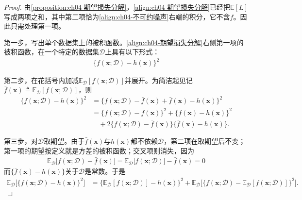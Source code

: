 \documentclass[../../main.tex]{subfiles}
\begin{document}
\begin{proof}
由\cref{proposition:ch04-期望损失分解}，\eqref{align:ch04-期望损失分解}已经把$\mathbb{E}[L]$写成两项之和，其中第二项恰为\eqref{align:ch04-不可约噪声}右端的积分，它不含$f$。因此只需处理第一项。

第一步，写出单个数据集上的被积函数。\eqref{align:ch04-期望损失分解}右侧第一项的被积函数，在一个特定的数据集$\mathcal{D}$上具有以下形式：
\begin{align}
  \{f(\boldsymbol{x};\mathcal{D})-h(\boldsymbol{x})\}^2
  \label{align:ch04-偏差方差被积函数}
\end{align}

第二步，在花括号内加减$\mathbb{E}_{\mathcal{D}}[f(\boldsymbol{x};\mathcal{D})]$并展开。为简洁起见记$\bar{f}(\boldsymbol{x})\triangleq\mathbb{E}_{\mathcal{D}}[f(\boldsymbol{x};\mathcal{D})]$，则
\begin{align}
  \{f(\boldsymbol{x};\mathcal{D})-h(\boldsymbol{x})\}^2
  &=\bigl\{f(\boldsymbol{x};\mathcal{D})-\bar{f}(\boldsymbol{x})+\bar{f}(\boldsymbol{x})-h(\boldsymbol{x})\bigr\}^2\nonumber\\
  &=\bigl\{f(\boldsymbol{x};\mathcal{D})-\bar{f}(\boldsymbol{x})\bigr\}^2
  +\bigl\{\bar{f}(\boldsymbol{x})-h(\boldsymbol{x})\bigr\}^2\nonumber\\
  &\quad+2\bigl\{f(\boldsymbol{x};\mathcal{D})-\bar{f}(\boldsymbol{x})\bigr\}\bigl\{\bar{f}(\boldsymbol{x})-h(\boldsymbol{x})\bigr\}.
  \label{align:ch04-偏差方差展开}
\end{align}

第三步，对$\mathcal{D}$取期望。由于$\bar{f}(\boldsymbol{x})$与$h(\boldsymbol{x})$都不依赖$\mathcal{D}$，第二项在取期望后不变；第一项的期望按定义就是方差的被积函数；交叉项则消失，因为
\begin{align*}
  \mathbb{E}_{\mathcal{D}}\bigl[f(\boldsymbol{x};\mathcal{D})-\bar{f}(\boldsymbol{x})\bigr]
  =\mathbb{E}_{\mathcal{D}}\bigl[f(\boldsymbol{x};\mathcal{D})\bigr]-\bar{f}(\boldsymbol{x})=0
\end{align*}
而$\{\bar{f}(\boldsymbol{x})-h(\boldsymbol{x})\}$关于$\mathcal{D}$是常数。于是
\begin{align}
  \mathbb{E}_{\mathcal{D}}\bigl[\{f(\boldsymbol{x};\mathcal{D})-h(\boldsymbol{x})\}^2\bigr]
  &=\bigl\{\mathbb{E}_{\mathcal{D}}[f(\boldsymbol{x};\mathcal{D})]-h(\boldsymbol{x})\bigr\}^2
  +\mathbb{E}_{\mathcal{D}}\bigl[\{f(\boldsymbol{x};\mathcal{D})-\mathbb{E}_{\mathcal{D}}[f(\boldsymbol{x};\mathcal{D})]\}^2\bigr].
  \label{align:ch04-偏差方差分解式}
\end{align}


\end{proof}
\end{document}
